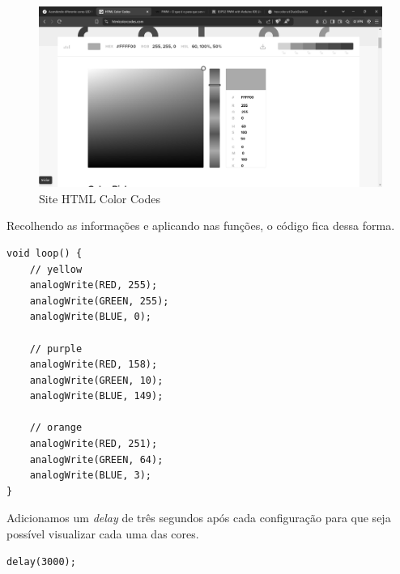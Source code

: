 \begin{figure}[H]
    \centering
    \includegraphics[width=0.5\linewidth]{img/htmlcolors.jpg}
    \caption{Site HTML Color Codes}
    \label{fig:html-color-codes-site}
\end{figure}

Recolhendo as informações e aplicando nas funções, o código fica dessa forma.

\begin{lstlisting}
void loop() {
    // yellow
    analogWrite(RED, 255);
    analogWrite(GREEN, 255);
    analogWrite(BLUE, 0);
    
    // purple
    analogWrite(RED, 158);
    analogWrite(GREEN, 10);
    analogWrite(BLUE, 149);
    
    // orange
    analogWrite(RED, 251);
    analogWrite(GREEN, 64);
    analogWrite(BLUE, 3);
}
\end{lstlisting}

Adicionamos um \textit{delay} de três segundos após cada configuração para que seja possível visualizar cada uma das cores.

\begin{lstlisting}
delay(3000);
\end{lstlisting}
